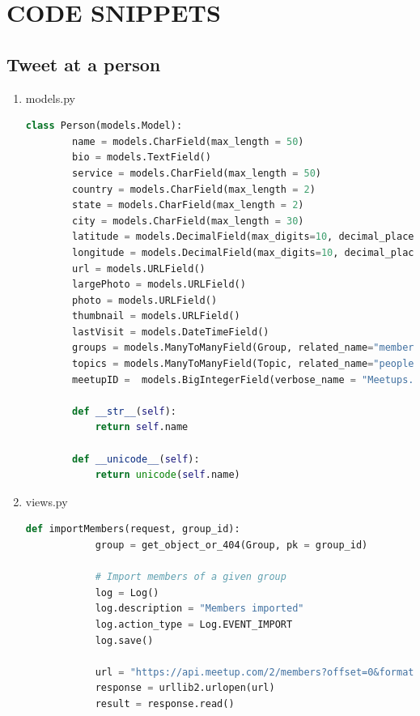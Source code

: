 \documentclass[letterpaper,10pt,onecolumn]{IEEEtran} %
\begin{document}
\section{CODE SNIPPETS}

\subsection{Tweet at a person}
\begin{enumerate}
  \item models.py
  \begin{center}
    \begin{lstlisting}[language=Python]
    class Person(models.Model):
        name = models.CharField(max_length = 50)
        bio = models.TextField()
        service = models.CharField(max_length = 50)
        country = models.CharField(max_length = 2)
        state = models.CharField(max_length = 2)
        city = models.CharField(max_length = 30)
        latitude = models.DecimalField(max_digits=10, decimal_places=6)
        longitude = models.DecimalField(max_digits=10, decimal_places=6)
        url = models.URLField()
        largePhoto = models.URLField()
        photo = models.URLField()
        thumbnail = models.URLField()
        lastVisit = models.DateTimeField()
        groups = models.ManyToManyField(Group, related_name="members")
        topics = models.ManyToManyField(Topic, related_name="people")
        meetupID =  models.BigIntegerField(verbose_name = "Meetups.com ID", unique=True)

        def __str__(self):
            return self.name

        def __unicode__(self):
            return unicode(self.name)
    \end{lstlisting}
  \end{center}

  \item views.py
    \begin{center}
      \begin{lstlisting}[language=Python]
        def importMembers(request, group_id):
            group = get_object_or_404(Group, pk = group_id)

            # Import members of a given group
            log = Log()
            log.description = "Members imported"
            log.action_type = Log.EVENT_IMPORT
            log.save()

            url = "https://api.meetup.com/2/members?offset=0&format=json&group_id=" + str(group.meetupID) + "&photo-host=public&page=500&sig_id=148657742&key=" + MEETUP_API_KEY
            response = urllib2.urlopen(url)
            result = response.read()


\end{lstlisting}
\end{center}
\end{enumerate}
\end{document}
